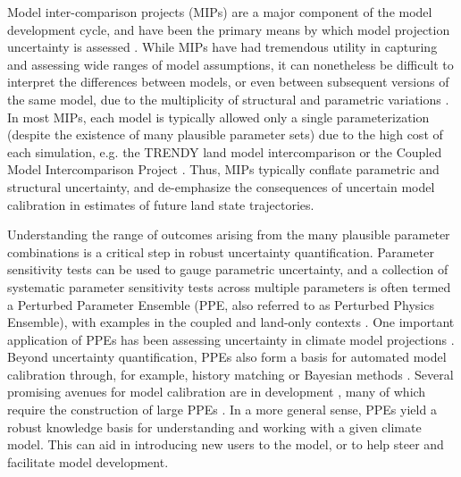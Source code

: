 \documentclass[draft]{agujournal2019}
\begin{document}
Model inter-comparison projects (MIPs) are a major component of the model development cycle, and have been the primary means by which model projection uncertainty is assessed \cite{henderson-sellers1995,pitman1999,wood1998,schlosser2000,eyring2016,friedlingstein2022}. While MIPs have had tremendous utility in capturing and assessing wide ranges of model assumptions, it can nonetheless be difficult to interpret the differences between models, or even between subsequent versions of the same model, due to the multiplicity of structural and parametric variations \cite{mcneall2016}. In most MIPs, each model is typically allowed only a single parameterization (despite the existence of many plausible parameter sets) due to the high cost of each simulation, e.g. the TRENDY land model intercomparison \cite{sitch2024} or the Coupled Model Intercomparison Project \cite{eyring2016}. Thus, MIPs typically conflate parametric and structural uncertainty, and de-emphasize the consequences of uncertain model calibration in estimates of future land state trajectories. 

Understanding the range of outcomes arising from the many plausible parameter combinations is a critical step in robust uncertainty quantification. 
Parameter sensitivity tests can be used to gauge parametric uncertainty, and
a collection of systematic parameter sensitivity tests across multiple parameters is often termed a Perturbed Parameter Ensemble (PPE, also referred to as Perturbed Physics Ensemble), with examples in the coupled \cite{murphy2004} and land-only contexts \cite{dagon2020}. 
One important application of PPEs has been assessing uncertainty in climate model projections \cite{murphy2004,sanderson2008,booth2012,hawkins2019,yamazaki2021,peatier2022,tett2022}.
Beyond uncertainty quantification, PPEs also form a basis for automated model calibration through, for example, history matching \cite{williamson2013,williamson2017,hourdin2020,couvreux2021} or Bayesian methods \cite{cleary2021}.
Several promising avenues for model calibration are in development \cite{pinnington2020,cleary2021,alonso-gonzalez2022}, many of which require the construction of large PPEs \cite{qian2018}.
In a more general sense, PPEs yield a robust knowledge basis for understanding and working with a given climate model. 
This can aid in introducing new users to the model, or to help steer and facilitate model development.
\end{document}
